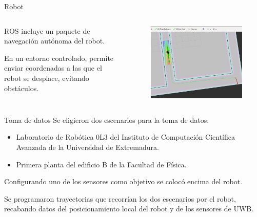\documentclass[xcolor=table]{beamer}
\begin{document}
  \begin{frame}{Robot}
    \begin{columns}
      \begin{column}{0.5\textwidth}
        ROS incluye un paquete de navegación autónoma del robot.

        \vspace{0.5cm}
        En un entorno controlado, permite enviar coordenadas a las que el robot se desplace, evitando obstáculos.
      \end{column}
      \begin{column}{0.5\textwidth}
        \begin{figure}[H]
          \centering
          \includegraphics[width=\textwidth]{pic/Trayectoria.png}
          \label{fig:robot}
      \end{figure}
      \end{column}
    \end{columns}
  \end{frame}

  \begin{frame}{Toma de datos}
    Se eligieron dos escenarios para la toma de datos:
    \begin{itemize}
      \item Laboratorio de Robótica 0L3 del Instituto de Computación Científica Avanzada de la Universidad de Extremadura.
      \item Primera planta del edificio B de la Facultad de Física.
    \end{itemize}

    \vspace{0.5cm}
    Configurando uno de los sensores como objetivo se colocó encima del robot.

    \vspace{0.5cm}
    Se programaron trayectorias que recorrían los dos escenarios por el robot, recabando datos del posicionamiento local del robot y de los sensores de UWB.
  \end{frame}
\end{document}
